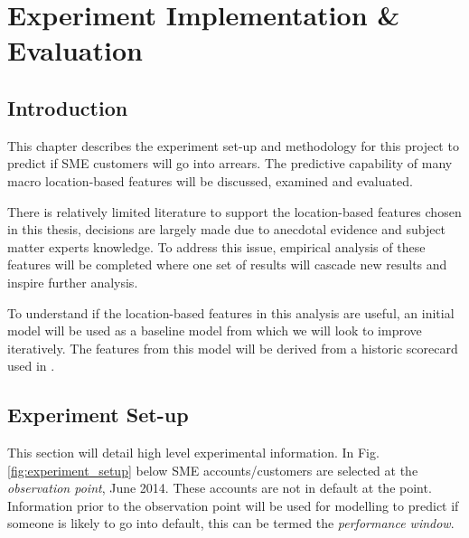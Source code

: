 
\chapter{Experiment Implementation \& Evaluation} %

\label{Chapter4} %


\section{Introduction}
This chapter describes the experiment set-up and methodology for this project to predict if SME customers will go into arrears. The predictive capability of many macro location-based features will be discussed, examined and evaluated.

There is relatively limited literature to support the location-based features chosen in this thesis, decisions are largely made due to anecdotal evidence and subject matter experts knowledge. To address this issue, empirical analysis of these features will be completed where one set of results will cascade new results and inspire further analysis. 

To understand if the location-based features in this analysis are useful, an initial model will be used as a baseline model from which we will look to improve iteratively. The features from this model will be derived from a historic scorecard used in \subjectname.  

\section{Experiment Set-up}
This section will detail high level experimental information. In Fig. \ref{fig:experiment_setup} below SME accounts/customers are selected at the \textit{observation point}, June 2014. These accounts are not in default at the point. Information prior to the observation point will be used for modelling to predict if someone is likely to go into default, this can be termed the \textit{performance window}.

